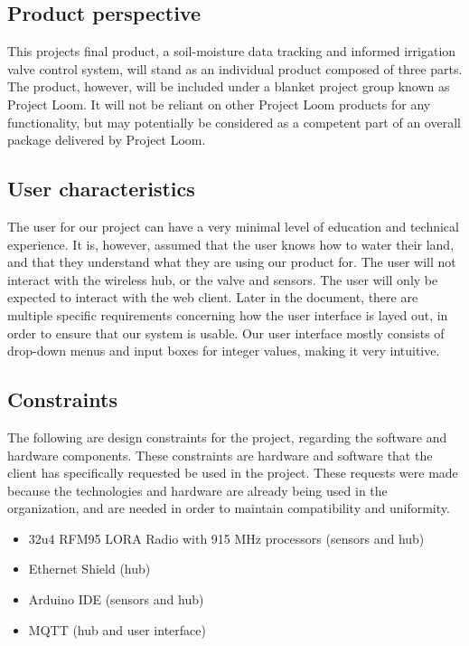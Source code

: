 \documentclass[onecolumn, draftclsnofoot,10pt, compsoc]{IEEEtran}
\begin{document}
	\subsection{Product perspective}
	This projects final product, a soil-moisture data tracking and informed irrigation valve control system, will stand as an individual product composed of three parts.
	The product, however, will be included under a blanket project group known as Project Loom.
	It will not be reliant on other Project Loom products for any functionality, but may potentially be considered as a competent part of an overall package delivered by Project Loom.
	
	
	\subsection{User characteristics}
	The user for our project can have a very minimal level of education and technical experience.
    It is, however, assumed that the user knows how to water their land, and that they understand what they are using our product for. 
    The user will not interact with the wireless hub, or the valve and sensors. 
    The user will only be expected to interact with the web client. 
    Later in the document, there are multiple specific requirements concerning how the user interface is layed out, in order to ensure that our system is usable. 
    Our user interface mostly consists of drop-down menus and input boxes for integer values, making it very intuitive. 
    \subsection{Constraints}
	The following are design constraints for the project, regarding the software and hardware components.
	These constraints are hardware and software that the client has specifically requested be used in the project.
	These requests were made because the technologies and hardware are already being used in the organization, and are needed in order to maintain compatibility and uniformity. 
	\begin{itemize}
		\item{32u4 RFM95 LORA Radio with 915 MHz processors (sensors and hub)}
		\item{Ethernet Shield (hub)}
		\item{Arduino IDE (sensors and hub)}
		\item{MQTT (hub and user interface)}
	\end{itemize}
\end{document}

